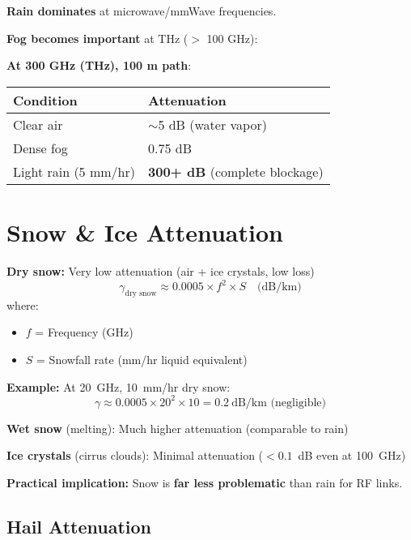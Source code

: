 \textbf{Rain dominates} at microwave/mmWave frequencies.

\textbf{Fog becomes important} at THz ($>$ 100 GHz):

\textbf{At 300 GHz (THz), 100 m path}:

{\def\LTcaptype{} %
\begin{longtable}[]{@{}ll@{}}
\toprule\noalign{}
Condition & Attenuation \\
\midrule\noalign{}
\endhead
\bottomrule\noalign{}
\endlastfoot
Clear air & $\sim$5 dB (water vapor) \\
Dense fog & 0.75 dB \\
Light rain (5 mm/hr) & \textbf{300+ dB} (complete blockage) \\
\end{longtable}
}



\section{Snow \& Ice Attenuation}

\textbf{Dry snow:} Very low attenuation (air + ice crystals, low loss)
\begin{equation}
\gamma_{\text{dry snow}} \approx 0.0005 \times f^2 \times S \quad \text{(dB/km)}
\end{equation}
where:
\begin{itemize}
\item $f$ = Frequency (GHz)
\item $S$ = Snowfall rate (mm/hr liquid equivalent)
\end{itemize}

\textbf{Example:} At 20~GHz, 10~mm/hr dry snow:
\begin{equation}
\gamma \approx 0.0005 \times 20^2 \times 10 = 0.2~\text{dB/km (negligible)}
\end{equation}

\textbf{Wet snow} (melting): Much higher attenuation (comparable to rain)

\textbf{Ice crystals} (cirrus clouds): Minimal attenuation ($< 0.1$~dB even at 100~GHz)

\textbf{Practical implication:} Snow is \textbf{far less problematic} than rain for RF links.

\subsection{Hail Attenuation}

